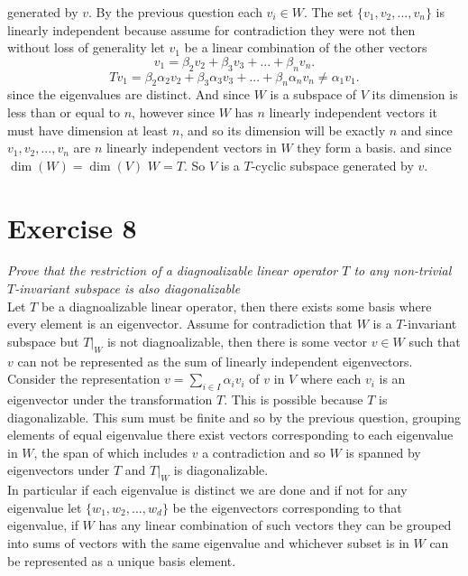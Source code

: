 \documentclass{article}
\begin{document}
\begin{enumerate}
                generated by  $v$. By the previous question each $v_i \in W$.  The set $\{v_1,v_2,...,v_n\}$ is
                linearly independent because assume for contradiction they were not then without loss of generality let $v_1$ be a linear combination of the other vectors
                \[
                v_1 = \beta_2v_2 + \beta_3v_3 +... + \beta_nv_n
                .\] 
                \[
                Tv_1 = \beta_2\alpha_2v_2+ \beta_3\alpha_3v_3 + ... + \beta_n\alpha_nv_n \ne \alpha_1v_1
                .\] 
                since the eigenvalues are distinct. And since $W$ is a subspace of  $V$ its dimension is
                less than or equal to $n$, however since $W$ has $n$ linearly independent vectors it must have dimension at
                least $n$, and so its dimension will be exactly $n$ and since $v_1,v_2,...,v_n$ are $n$ linearly independent vectors in $W$ they
                form a basis. and since $\dim(W) = \dim(V)$  $W = T$. So  $V$ is a $T$-cyclic subspace generated by $v$.
                
                
    \end{enumerate}
    \section{Exercise 8}
    \emph{
        Prove that the restriction of a diagnoalizable linear operator $T$ to any non-trivial $T$-invariant subspace
        is also diagonalizable
    }\\
    Let $T$ be a diagnoalizable linear operator, then there exists some basis where every element is an eigenvector.
    Assume for contradiction that $W$ is a $T$-invariant subspace but $T|_W$ is not diagnoalizable, then there is some vector $v \in W$
    such that $v$ can not be represented as the sum of linearly independent eigenvectors.
    Consider the representation $v = \sum_{i \in I}^{}\alpha_iv_i$ of $v$ in $V$ where each  $v_i$ is an eigenvector under the transformation $T$. 
    This is possible because $T$ is diagonalizable. This sum must be finite and so by the previous question, grouping elements of equal eigenvalue there exist vectors
    corresponding to each eigenvalue in $W$, the span of which includes $v$ a contradiction and so $W$ is spanned by eigenvectors under $T$ and $T|_W$ is diagonalizable.
    \\
    In particular if each eigenvalue is distinct we are done and if not for any eigenvalue let $\{w_1,w_2,...,w_d\}$ be the eigenvectors  corresponding
    to that eigenvalue, if $W$ has any linear combination of such vectors they can be grouped into sums of vectors with the same eigenvalue and whichever subset is in $W$ can be represented
    as a unique basis element.
    
\end{document}
